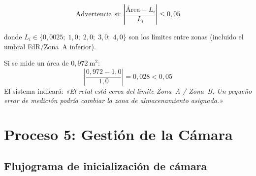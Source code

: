 \documentclass[12pt, a4paper]{article}
\begin{document}
$$\text{Advertencia si: } \left|\frac{\text{Área} - L_i}{L_i}\right| \leq 0{,}05$$

donde $L_i \in \{0{,}0025;\; 1{,}0;\; 2{,}0;\; 3{,}0;\; 4{,}0\}$ son los
límites entre zonas (incluido el umbral FdR/Zona~A inferior).

\begin{notebox}[title={Ejemplo de advertencia}]
Si se mide un área de $0{,}972\ \text{m}^2$:
$$\left|\frac{0{,}972 - 1{,}0}{1{,}0}\right| = 0{,}028 < 0{,}05$$
El sistema indicará: \emph{«El retal está cerca del límite Zona~A / Zona~B.
Un pequeño error de medición podría cambiar la zona de almacenamiento asignada.»}
\end{notebox}

\section{Proceso 5: Gestión de la Cámara}

\subsection{Flujograma de inicialización de cámara}
\end{document}
